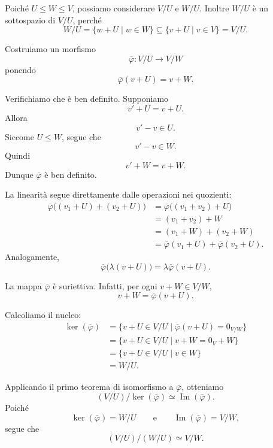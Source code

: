\documentclass[a4paper]{article}
\begin{document}
\begin{radioactive}
\begin{snippetproof}{}
    Poiché \(U \leq W \leq V\), possiamo considerare \(V/U\) e \(W/U\).
    Inoltre \(W/U\) è un sottospazio di \(V/U\), perché
    \[
        W/U
        =
        \{w+U \mid w \in W\}
        \subseteq
        \{v+U \mid v \in V\}
        =
        V/U.
    \]

    Costruiamo un morfismo
    \[
        \overline{\varphi}
        \colon
        V/U \to V/W
    \]
    ponendo
    \[
        \overline{\varphi}(v+U)=v+W.
    \]

    Verifichiamo che è ben definito.
    Supponiamo
    \[
        v'+U=v+U.
    \]
    Allora
    \[
        v'-v \in U.
    \]
    Siccome \(U \leq W\), segue che
    \[
        v'-v \in W.
    \]
    Quindi
    \[
        v'+W=v+W.
    \]
    Dunque \(\overline{\varphi}\) è ben definito.

    La linearità segue direttamente dalle operazioni nei quozienti:
    \begin{align*}
        \overline{\varphi}\big((v_1+U)+(v_2+U)\big)
        &=
        \overline{\varphi}\big((v_1+v_2)+U\big) \\
        &=
        (v_1+v_2)+W \\
        &=
        (v_1+W)+(v_2+W) \\
        &=
        \overline{\varphi}(v_1+U)
        +
        \overline{\varphi}(v_2+U).
    \end{align*}
    Analogamente,
    \[
        \overline{\varphi}\big(\lambda(v+U)\big)
        =
        \lambda\overline{\varphi}(v+U).
    \]

    La mappa \(\overline{\varphi}\) è suriettiva.
    Infatti, per ogni \(v+W \in V/W\),
    \[
        v+W=\overline{\varphi}(v+U).
    \]

    Calcoliamo il nucleo:
    \begin{align*}
        \ker(\overline{\varphi})
        &=
        \{v+U \in V/U \mid \overline{\varphi}(v+U)=0_{V/W}\} \\
        &=
        \{v+U \in V/U \mid v+W=0_V+W\} \\
        &=
        \{v+U \in V/U \mid v \in W\} \\
        &=
        W/U.
    \end{align*}

    Applicando il primo teorema di isomorfismo a \(\overline{\varphi}\), otteniamo
    \[
        (V/U)/\ker(\overline{\varphi})
        \simeq
        \operatorname{Im}(\overline{\varphi}).
    \]
    Poiché
    \[
        \ker(\overline{\varphi})=W/U
        \qquad
        \text{e}
        \qquad
        \operatorname{Im}(\overline{\varphi})=V/W,
    \]
    segue che
    \[
        (V/U)/(W/U)
        \simeq
        V/W.
    \]
\end{snippetproof}
\end{radioactive}
\end{document}
